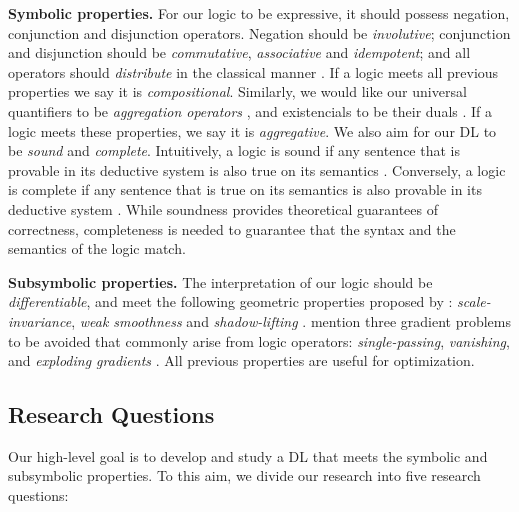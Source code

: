 \textbf{Symbolic properties.} For our logic to be expressive, it should possess negation, conjunction and disjunction operators. Negation should be \emph{involutive}; conjunction and disjunction should be \emph{commutative}, \emph{associative} and \emph{idempotent}; and all operators should \emph{distribute} in the classical manner \citep{galatos2007residuated}. If a logic meets all previous properties we say it is \emph{compositional}. Similarly, we would like our universal quantifiers to be \emph{aggregation operators} \citep{LIU19981}, and existencials to be their duals \citep{LIU19981}. If a logic meets these properties, we say it is \emph{aggregative}.  We also aim for our DL to be \emph{sound} and \emph{complete}. Intuitively, a logic is sound if any sentence that is provable in its deductive system is also true on its semantics \citep{galatos2007residuated}. Conversely, a logic is complete if any sentence that is true on its semantics is also provable in its deductive system \citep{galatos2007residuated}. While soundness provides theoretical guarantees of correctness, completeness is needed to guarantee that the syntax and the semantics of the logic match.

\textbf{Subsymbolic properties.} The interpretation of our logic should be \emph{differentiable}, and meet the following geometric properties proposed by \citeauthor{varnai2020robustness}: \emph{scale-invariance}, \emph{weak smoothness} and \emph{shadow-lifting} \citep{varnai2020robustness}. \citeauthor{van2022analyzing} mention three gradient problems to be avoided that commonly arise from logic operators: \emph{single-passing}, \emph{vanishing}, and \emph{exploding gradients} \citep{van2022analyzing}. All previous properties are useful for optimization.  

\subsection{Research Questions}

Our high-level goal is to develop and study a DL that meets the symbolic and subsymbolic properties. To this aim, we divide our research into five research questions:

